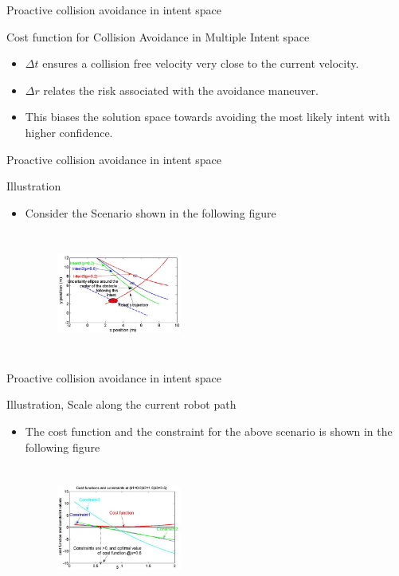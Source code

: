 \documentclass{beamer}
\begin{document}
\begin{frame}{Proactive collision avoidance in intent space}
\begin{block}{Cost function for Collision Avoidance in Multiple Intent space}
\begin{itemize}
\item{$\Delta t$ ensures a collision free velocity very close to the current velocity.}
\item{$\Delta r$ relates the risk associated with the avoidance maneuver.}
\item{This biases the solution space towards avoiding the most likely intent with higher confidence.}
\end{itemize}

\end{block}
\end{frame}
\begin{frame}{Proactive collision avoidance in intent space}
\begin{block}{Illustration}
\begin{itemize}
\item{Consider the Scenario shown in the following figure}
\begin{figure}
\includegraphics[width= 4.1cm, height=4.1cm]{fig11.eps}
\end{figure}

\end{itemize}

\end{block}
\end{frame}
\begin{frame}{Proactive collision avoidance in intent space}
\begin{block}{Illustration, Scale along the current robot path}
\begin{itemize}
\item{The cost function and the constraint for the above scenario is shown in the following figure}
\begin{figure}
\includegraphics[width= 4.1cm, height=4.1cm]{fig12.eps}
\end{figure}
\end{itemize}

\end{block}
\end{frame}
\end{document}
